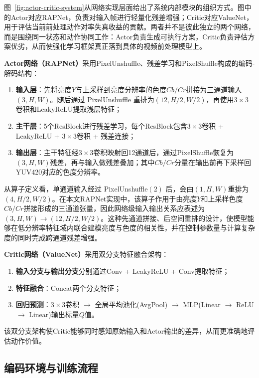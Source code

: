 图~\ref{fig:actor-critic-system}从网络实现层面给出了系统内部模块的组织方式。图中的Actor对应RAPNet，负责对输入帧进行轻量化残差增强；Critic对应ValueNet，用于评估当前前处理动作对率失真收益的贡献。两者并不是彼此独立的两个网络，而是围绕同一状态和动作协同工作：Actor负责生成可执行方案，Critic负责评估方案优劣，从而使强化学习框架真正落到具体的视频前处理模型上。

\textbf{Actor网络（RAPNet）}采用PixelUnshuffle、残差学习和PixelShuffle构成的编码-解码结构：

\begin{enumerate}
  \item \textbf{输入层}：先将亮度$Y$与上采样到亮度分辨率的色度$Cb/Cr$拼接为三通道输入$(3, H, W)$。随后通过 PixelUnshuffle 重排为$(12, H/2, W/2)$，再使用$3 \times 3$卷积和LeakyReLU提取浅层特征；
  \item \textbf{主干层}：5个ResBlock进行残差学习，每个ResBlock包含$3 \times 3$卷积 + LeakyReLU + $3 \times 3$卷积 + 残差连接；
  \item \textbf{输出层}：主干特征经$3 \times 3$卷积映射回12通道后，通过PixelShuffle恢复为$(3, H, W)$残差，再与输入做残差叠加；其中$Cb/Cr$分量在输出前再下采样回YUV420对应的色度分辨率。
\end{enumerate}

从算子定义看，单通道输入经过 PixelUnshuffle$(2)$ 后，会由$(1,H,W)$重排为$(4,H/2,W/2)$。在本文RAPNet实现中，该算子作用于由亮度$Y$和上采样色度$Cb/Cr$拼接形成的三通道张量，因此网络级输入输出关系应表述为$(3,H,W)\rightarrow(12,H/2,W/2)$。这种先通道拼接、后空间重排的设计，使模型能够在低分辨率特征域内联合建模亮度与色度的相关性，并在控制参数量与计算复杂度的同时完成跨通道残差增强。

\textbf{Critic网络（ValueNet）}采用双分支特征融合架构：

\begin{enumerate}
  \item \textbf{输入分支}与\textbf{输出分支}分别通过Conv + LeakyReLU + Conv提取特征；
  \item \textbf{特征融合}：Concat两个分支特征；
  \item \textbf{回归预测}：$3 \times 3$卷积 $\to$ 全局平均池化(AvgPool) $\to$ MLP(Linear $\to$ ReLU $\to$ Linear)输出标量$Q$值。
\end{enumerate}

该双分支架构使Critic能够同时感知原始输入和Actor输出的差异，从而更准确地评估动作价值。

\subsection{编码环境与训练流程}

